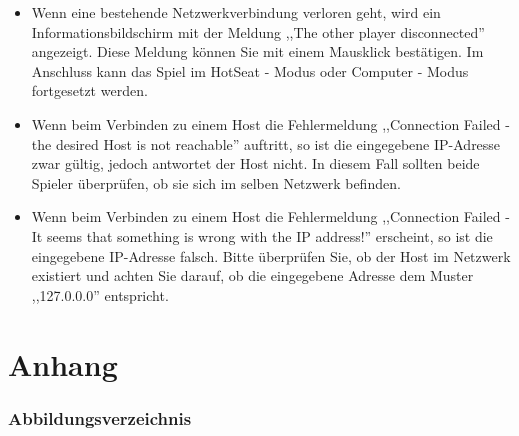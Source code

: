 \documentclass[12pt,a4paper]{article}
\begin{document}
\begin{itemize}
 
\item{Wenn eine bestehende Netzwerkverbindung verloren geht, wird ein Informationsbildschirm mit der Meldung ,,The other player disconnected'' angezeigt. Diese Meldung können Sie mit einem Mausklick bestätigen. Im Anschluss kann das Spiel im HotSeat - Modus oder Computer - Modus fortgesetzt werden.} 

\item{Wenn beim Verbinden zu einem Host die Fehlermeldung ,,Connection Failed - the desired Host is not reachable'' auftritt, so ist die eingegebene IP-Adresse zwar gültig, jedoch antwortet der Host nicht. In diesem Fall sollten beide Spieler überprüfen, ob sie sich im selben Netzwerk befinden.}

\item{Wenn beim Verbinden zu einem Host die Fehlermeldung ,,Connection Failed - It seems that something is wrong with the IP address!'' erscheint, so ist die eingegebene IP-Adresse falsch. Bitte überprüfen Sie, ob der Host im Netzwerk existiert und achten Sie darauf, ob die eingegebene Adresse dem Muster ,,127.0.0.0'' entspricht.} 
 
\end{itemize}








\clearpage\vfill\newpage{}
\renewcommand{\thepage}{\Roman{page}}%
\setcounter{page}{1}

\setcounter{section}{2000}
\renewcommand\thesection{I}
\renewcommand\thesubsection{\thesection.\Roman{subsection}}
\renewcommand\thesubsubsection{\thesubsection.\Roman{subsubsection}}

	\part*{\sc Anhang}
\section{Abbildungsverzeichnis}\noindent%
\begingroup
\renewcommand{\section}[2]{}
	\listoffigures
\endgroup
\end{document}
